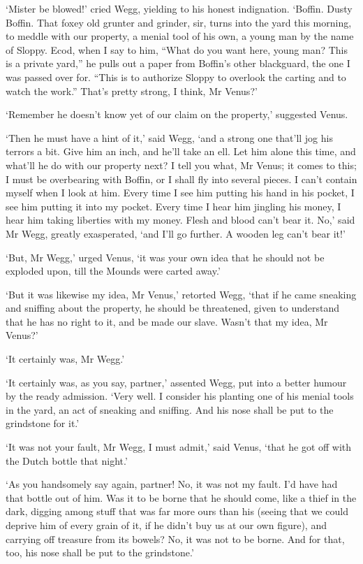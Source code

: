 ‘Mister be blowed!’ cried Wegg, yielding to his honest indignation.
‘Boffin. Dusty Boffin. That foxey old grunter and grinder, sir, turns
into the yard this morning, to meddle with our property, a menial tool
of his own, a young man by the name of Sloppy. Ecod, when I say to him,
“What do you want here, young man? This is a private yard,” he pulls out
a paper from Boffin’s other blackguard, the one I was passed over for.
“This is to authorize Sloppy to overlook the carting and to watch the
work.” That’s pretty strong, I think, Mr Venus?’

‘Remember he doesn’t know yet of our claim on the property,’ suggested
Venus.

‘Then he must have a hint of it,’ said Wegg, ‘and a strong one that’ll
jog his terrors a bit. Give him an inch, and he’ll take an ell. Let him
alone this time, and what’ll he do with our property next? I tell you
what, Mr Venus; it comes to this; I must be overbearing with Boffin, or
I shall fly into several pieces. I can’t contain myself when I look
at him. Every time I see him putting his hand in his pocket, I see him
putting it into my pocket. Every time I hear him jingling his money, I
hear him taking liberties with my money. Flesh and blood can’t bear it.
No,’ said Mr Wegg, greatly exasperated, ‘and I’ll go further. A wooden
leg can’t bear it!’

‘But, Mr Wegg,’ urged Venus, ‘it was your own idea that he should not be
exploded upon, till the Mounds were carted away.’

‘But it was likewise my idea, Mr Venus,’ retorted Wegg, ‘that if he came
sneaking and sniffing about the property, he should be threatened, given
to understand that he has no right to it, and be made our slave. Wasn’t
that my idea, Mr Venus?’

‘It certainly was, Mr Wegg.’

‘It certainly was, as you say, partner,’ assented Wegg, put into
a better humour by the ready admission. ‘Very well. I consider his
planting one of his menial tools in the yard, an act of sneaking and
sniffing. And his nose shall be put to the grindstone for it.’

‘It was not your fault, Mr Wegg, I must admit,’ said Venus, ‘that he got
off with the Dutch bottle that night.’

‘As you handsomely say again, partner! No, it was not my fault. I’d have
had that bottle out of him. Was it to be borne that he should come, like
a thief in the dark, digging among stuff that was far more ours than his
(seeing that we could deprive him of every grain of it, if he didn’t buy
us at our own figure), and carrying off treasure from its bowels? No,
it was not to be borne. And for that, too, his nose shall be put to the
grindstone.’

